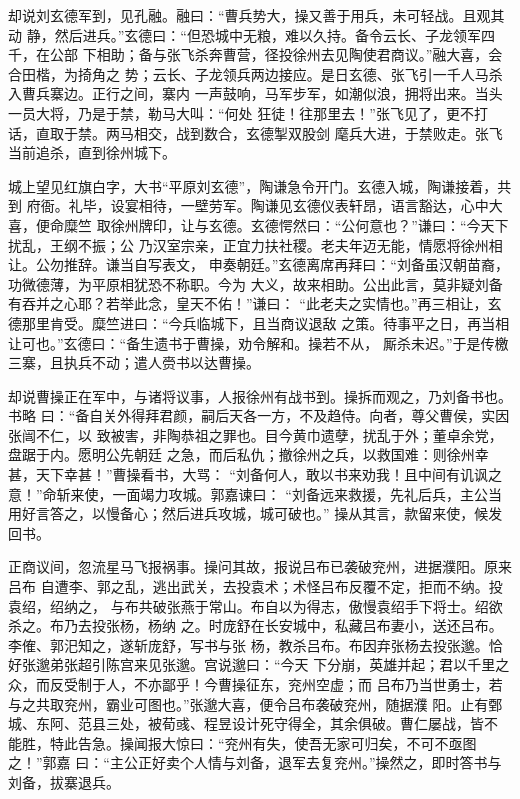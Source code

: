 却说刘玄德军到，见孔融。融曰：“曹兵势大，操又善于用兵，未可轻战。且观其动
静，然后进兵。”玄德曰：“但恐城中无粮，难以久持。备令云长、子龙领军四千，在公部
下相助；备与张飞杀奔曹营，径投徐州去见陶使君商议。”融大喜，会合田楷，为掎角之
势；云长、子龙领兵两边接应。是日玄德、张飞引一千人马杀入曹兵寨边。正行之间，寨内
一声鼓响，马军步军，如潮似浪，拥将出来。当头一员大将，乃是于禁，勒马大叫：“何处
狂徒！往那里去！”张飞见了，更不打话，直取于禁。两马相交，战到数合，玄德掣双股剑
麾兵大进，于禁败走。张飞当前追杀，直到徐州城下。

城上望见红旗白字，大书“平原刘玄德”，陶谦急令开门。玄德入城，陶谦接着，共到
府衙。礼毕，设宴相待，一壁劳军。陶谦见玄德仪表轩昂，语言豁达，心中大喜，便命糜竺
取徐州牌印，让与玄德。玄德愕然曰：“公何意也？”谦曰：“今天下扰乱，王纲不振；公
乃汉室宗亲，正宜力扶社稷。老夫年迈无能，情愿将徐州相让。公勿推辞。谦当自写表文，
申奏朝廷。”玄德离席再拜曰：“刘备虽汉朝苗裔，功微德薄，为平原相犹恐不称职。今为
大义，故来相助。公出此言，莫非疑刘备有吞并之心耶？若举此念，皇天不佑！”谦曰：
“此老夫之实情也。”再三相让，玄德那里肯受。糜竺进曰：“今兵临城下，且当商议退敌
之策。待事平之日，再当相让可也。”玄德曰：“备生遗书于曹操，劝令解和。操若不从，
厮杀未迟。”于是传檄三寨，且执兵不动；遣人赍书以达曹操。

却说曹操正在军中，与诸将议事，人报徐州有战书到。操拆而观之，乃刘备书也。书略
曰：“备自关外得拜君颜，嗣后天各一方，不及趋侍。向者，尊父曹侯，实因张闿不仁，以
致被害，非陶恭祖之罪也。目今黄巾遗孽，扰乱于外；董卓余党，盘踞于内。愿明公先朝廷
之急，而后私仇；撤徐州之兵，以救国难：则徐州幸甚，天下幸甚！”曹操看书，大骂：
“刘备何人，敢以书来劝我！且中间有讥讽之意！”命斩来使，一面竭力攻城。郭嘉谏曰：
“刘备远来救援，先礼后兵，主公当用好言答之，以慢备心；然后进兵攻城，城可破也。”
操从其言，款留来使，候发回书。

正商议间，忽流星马飞报祸事。操问其故，报说吕布已袭破兖州，进据濮阳。原来吕布
自遭李、郭之乱，逃出武关，去投袁术；术怪吕布反覆不定，拒而不纳。投袁绍，绍纳之，
与布共破张燕于常山。布自以为得志，傲慢袁绍手下将士。绍欲杀之。布乃去投张杨，杨纳
之。时庞舒在长安城中，私藏吕布妻小，送还吕布。李傕、郭汜知之，遂斩庞舒，写书与张
杨，教杀吕布。布因弃张杨去投张邈。恰好张邈弟张超引陈宫来见张邈。宫说邈曰：“今天
下分崩，英雄并起；君以千里之众，而反受制于人，不亦鄙乎！今曹操征东，兖州空虚；而
吕布乃当世勇士，若与之共取兖州，霸业可图也。”张邈大喜，便令吕布袭破兖州，随据濮
阳。止有鄄城、东阿、范县三处，被荀彧、程昱设计死守得全，其余俱破。曹仁屡战，皆不
能胜，特此告急。操闻报大惊曰：“兖州有失，使吾无家可归矣，不可不亟图之！”郭嘉
曰：“主公正好卖个人情与刘备，退军去复兖州。”操然之，即时答书与刘备，拔寨退兵。

